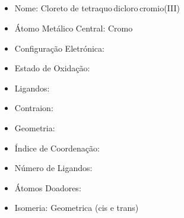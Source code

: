 \documentclass[12pt]{article}
\begin{document}
\noindent\begin{minipage}{\textwidth}

   \subsection{}
   \noindent\begin{itemize}
   \item Nome: Cloreto de tetraquo\,dicloro\,cromio(III)
   	
   
   \item Átomo Metálico Central: Cromo
   	
   	
   \item Configuração Eletrónica:
   
   
   \item Estado de Oxidação: 
   
   
   \item Ligandos:
   
   
   \item Contraion:
   
   
   \item Geometria:
   
   
   \item Índice de Coordenação: 
   
   
   \item Número de Ligandos:
   
   
   \item Átomos Doadores:
   
   
   \item Isomeria:
   	Geometrica (cis e trans)
   
   
   \end{itemize}
   
\end{minipage}
\end{document}
